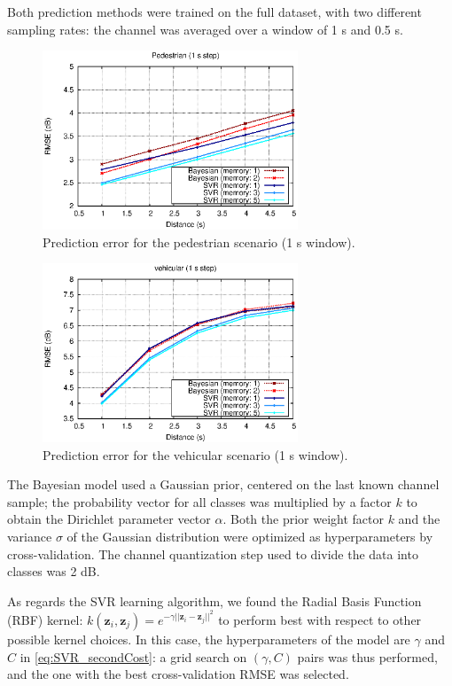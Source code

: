 \documentclass[conference, a4paper]{IEEEtran}
\begin{document}
Both prediction methods were trained on the full dataset, with two different sampling rates: the channel was averaged over a window of 1 s and 0.5 s.

\begin{figure}[ht]
\centering
\includegraphics[width=3in]{./graphics/pedestrian_1s.eps}
\caption{Prediction error for the pedestrian scenario (1 s window).}
\label{pedestrian1s}
\end{figure}

\begin{figure}[t]
\centering
\includegraphics[width=3in]{./graphics/vehicular_1s.eps}
\caption{Prediction error for the vehicular scenario (1 s window).}
\label{vehicular1s}
\end{figure}

The Bayesian model used a Gaussian prior, centered on the last known channel sample; the probability vector for all classes was multiplied by a factor $k$ to obtain the Dirichlet parameter vector $\alpha$. Both the prior weight factor $k$ and the variance $\sigma$ of the Gaussian distribution were optimized as hyperparameters by cross-validation. The channel quantization step used to divide the data into classes was 2 dB.

As regards the SVR learning algorithm, we found the Radial Basis Function (RBF) kernel: $k(\mathbf z_i, \mathbf z_j ) = e^{- \gamma ||\mathbf z_i - \mathbf z_j||^2}$ to perform best with respect to other possible kernel choices. In this case, the hyperparameters of the model are $\gamma$ and $C$ in \eqref{eq:SVR_secondCost}: a  grid search on $(\gamma, C)$ pairs was thus performed, and the one with the best cross-validation RMSE was selected.
\end{document}
